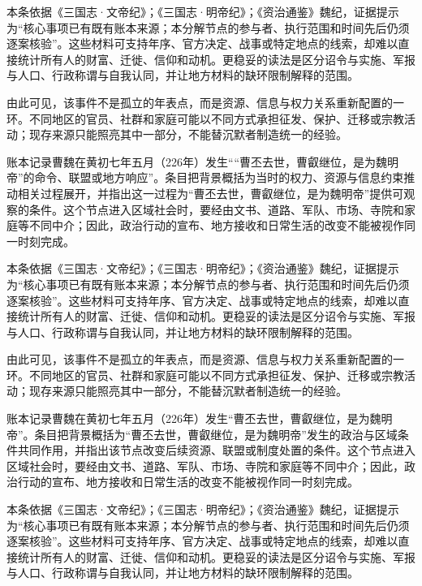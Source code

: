 本条依据《三国志·文帝纪》；《三国志·明帝纪》；《资治通鉴》魏纪，证据提示为“核心事项已有既有账本来源；本分解节点的参与者、执行范围和时间先后仍须逐案核验”。这些材料可支持年序、官方决定、战事或特定地点的线索，却难以直接统计所有人的财富、迁徙、信仰和动机。更稳妥的读法是区分诏令与实施、军报与人口、行政称谓与自我认同，并让地方材料的缺环限制解释的范围。

由此可见，该事件不是孤立的年表点，而是资源、信息与权力关系重新配置的一环。不同地区的官员、社群和家庭可能以不同方式承担征发、保护、迁移或宗教活动；现存来源只能照亮其中一部分，不能替沉默者制造统一的经验。

账本记录曹魏在黄初七年五月（226年）发生““曹丕去世，曹叡继位，是为魏明帝”的命令、联盟或地方响应”。条目把背景概括为当时的权力、资源与信息约束推动相关过程展开，并指出这一过程为“曹丕去世，曹叡继位，是为魏明帝”提供可观察的条件。这个节点进入区域社会时，要经由文书、道路、军队、市场、寺院和家庭等不同中介；因此，政治行动的宣布、地方接收和日常生活的改变不能被视作同一时刻完成。

本条依据《三国志·文帝纪》；《三国志·明帝纪》；《资治通鉴》魏纪，证据提示为“核心事项已有既有账本来源；本分解节点的参与者、执行范围和时间先后仍须逐案核验”。这些材料可支持年序、官方决定、战事或特定地点的线索，却难以直接统计所有人的财富、迁徙、信仰和动机。更稳妥的读法是区分诏令与实施、军报与人口、行政称谓与自我认同，并让地方材料的缺环限制解释的范围。

由此可见，该事件不是孤立的年表点，而是资源、信息与权力关系重新配置的一环。不同地区的官员、社群和家庭可能以不同方式承担征发、保护、迁移或宗教活动；现存来源只能照亮其中一部分，不能替沉默者制造统一的经验。

账本记录曹魏在黄初七年五月（226年）发生“曹丕去世，曹叡继位，是为魏明帝”。条目把背景概括为“曹丕去世，曹叡继位，是为魏明帝”发生的政治与区域条件共同作用，并指出该节点改变后续资源、联盟或制度处置的条件。这个节点进入区域社会时，要经由文书、道路、军队、市场、寺院和家庭等不同中介；因此，政治行动的宣布、地方接收和日常生活的改变不能被视作同一时刻完成。

本条依据《三国志·文帝纪》；《三国志·明帝纪》；《资治通鉴》魏纪，证据提示为“核心事项已有既有账本来源；本分解节点的参与者、执行范围和时间先后仍须逐案核验”。这些材料可支持年序、官方决定、战事或特定地点的线索，却难以直接统计所有人的财富、迁徙、信仰和动机。更稳妥的读法是区分诏令与实施、军报与人口、行政称谓与自我认同，并让地方材料的缺环限制解释的范围。

